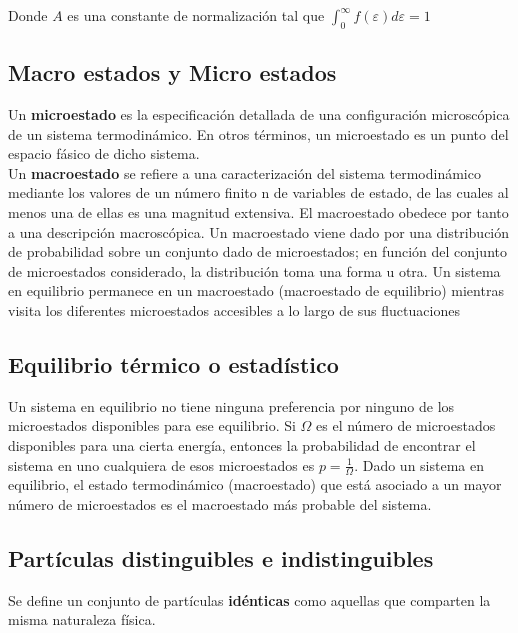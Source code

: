 \documentclass[oneside]{book}
\numberwithin{equation}{section}
\numberwithin{figure}{section}
\numberwithin{table}{section}
\begin{document}
			Donde $A$ es una constante de normalización tal que $\displaystyle \int_0^\infty f(\varepsilon)d\varepsilon=1$\\
								
			\subsection{Macro estados y Micro estados}
		
				Un \textbf{microestado} es la especificación detallada de una configuración microscópica de un sistema termodinámico. En otros términos, un microestado es un punto del espacio fásico de dicho sistema.\\
				
				Un \textbf{macroestado} se refiere a una caracterización del sistema termodinámico mediante los valores de un número finito n de variables de estado, de las cuales al menos una de ellas es una magnitud extensiva. El macroestado obedece por tanto a una descripción macroscópica. Un macroestado viene dado por una distribución de probabilidad sobre un conjunto dado de microestados; en función del conjunto de microestados considerado, la distribución toma una forma u otra. Un sistema en equilibrio permanece en un macroestado (macroestado de equilibrio) mientras visita los diferentes microestados accesibles a lo largo de sus fluctuaciones			
			
			\subsection{Equilibrio térmico o estadístico}
			
			Un sistema en equilibrio no tiene ninguna preferencia por ninguno de los microestados disponibles para ese equilibrio. Si $ \Omega$ es el número de microestados disponibles para una cierta energía, entonces la probabilidad de encontrar el sistema en uno cualquiera de esos microestados es $p=\frac{1}{\Omega}$. Dado un sistema en equilibrio, el estado termodinámico (macroestado) que está asociado a un mayor número de microestados es el macroestado más probable del sistema.\\
			
			\subsection{Partículas distinguibles e indistinguibles}
				
				Se define un conjunto de partículas \textbf{idénticas} como aquellas que comparten la misma naturaleza física.\\
				
\end{document}
